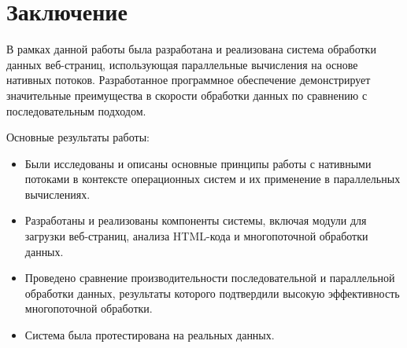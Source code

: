 \chapter*{Заключение}

В рамках данной работы была разработана и реализована система обработки данных веб-страниц, использующая параллельные вычисления на основе нативных потоков. Разработанное программное обеспечение демонстрирует значительные преимущества в скорости обработки данных по сравнению с последовательным подходом.

Основные результаты работы:
\begin{itemize}
	\item Были исследованы и описаны основные принципы работы с нативными потоками в контексте операционных систем и их применение в параллельных вычислениях.
	\item Разработаны и реализованы компоненты системы, включая модули для загрузки веб-страниц, анализа HTML-кода и многопоточной обработки данных.
	\item Проведено сравнение производительности последовательной и параллельной обработки данных, результаты которого подтвердили высокую эффективность многопоточной обработки.
	\item Система была протестирована на реальных данных.
\end{itemize}